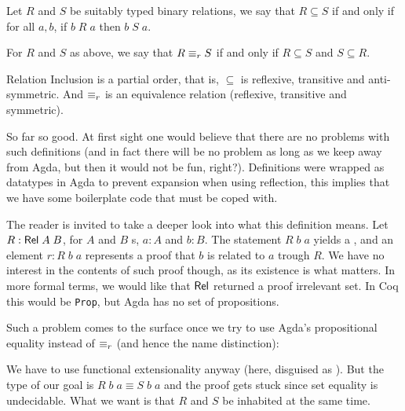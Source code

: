 \begin{mydef}
Let $R$ and $S$ be suitably typed binary relations, we say that $R \subseteq S$ 
if and only if for all $a , b$, if $b\;R\;a$ then $b\;S\;a$.\\
\end{mydef}

\begin{mydef}
For $R$ and $S$ as above, we say that $R \equiv_r S$ if and only if
$R \subseteq S$ and $S \subseteq R$.\\
\end{mydef}

\begin{lemma}
Relation Inclusion is a partial order, that is, $\subseteq$ is reflexive, transitive and anti-symmetric.
And $\equiv_r$ is an equivalence relation (reflexive, transitive and symmetric).\\
\end{lemma}

So far so good. At first sight one would believe that there are no problems with such definitions
(and in fact there will be no problem as long as we keep away from Agda, but then it would not be fun, right?). 
Definitions were wrapped as datatypes in Agda to prevent expansion when using reflection,
this implies that we have some boilerplate code that must be coped with.


The reader is invited to take a deeper look into what this definition means. 
Let $R : \D{Rel}\;A\;B$, for $A$ and $B$ s, $a : A$ and $b : B$. The statement
$R\;b\;a$ yields a , and an element $r : R\;b\;a$ represents
a proof that $b$ is related to $a$ trough $R$. We have no interest in the contents of
such proof though, as its existence is what matters. In more formal terms, we would like
that $\D{Rel}$ returned a proof irrelevant set. In Coq this would be \texttt{\small Prop}, but
Agda has no set of propositions.

Such a problem comes to the surface once we try to use Agda's propositional equality 
instead of $\equiv_r$ (and hence the name distinction):


We have to use functional extensionality anyway (here, disguised as ). But the 
type of our goal is $R\;b\;a \equiv S\;b\;a$ and the proof gets stuck since set equality is
undecidable. What we want is that $R$ and $S$ be inhabited at
the same time.

